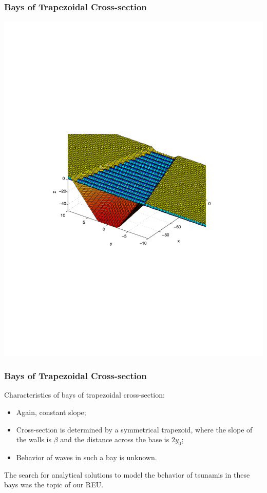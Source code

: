 \documentclass[xcolor=dvipsnames]{beamer}
\begin{document}
\begin{frame}
\frametitle{Bays of Trapezoidal Cross-section}
\includegraphics[width=\linewidth]{trapezoidalbay.pdf}
\end{frame}

\begin{frame}
\frametitle{Bays of Trapezoidal Cross-section}
Characteristics of bays of trapezoidal cross-section:
\begin{itemize}
\item Again, constant slope;
\item Cross-section is determined by a symmetrical trapezoid, where the slope of the walls is $\beta$ and the distance across the base is $2 y_0$;
\item Behavior of waves in such a bay is unknown. 
\end{itemize}
The search for analytical solutions to model the behavior of tsunamis in these bays was the topic of our REU.
\end{frame}
\end{document}
